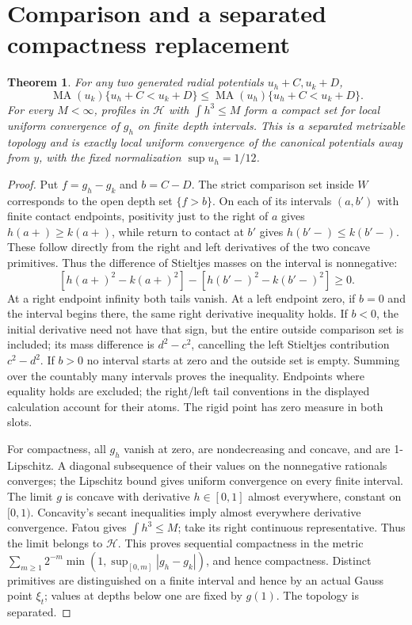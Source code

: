 \documentclass[11pt]{article}
\newtheorem{theorem}{Theorem}
\newcommand{\MA}{\operatorname{MA}}
\begin{document}
\section{Comparison and a separated compactness replacement}
\begin{theorem}\label{thm:comparison}
For any two generated radial potentials $u_h+C,u_k+D$,
\[
 \MA(u_k)\{u_h+C<u_k+D\}\leq
 \MA(u_h)\{u_h+C<u_k+D\}.
\]
For every $M<\infty$, profiles in $\mathcal H$ with $\int h^3\leq M$
form a compact set for local uniform convergence of $g_h$ on finite
depth intervals. This is a separated metrizable topology and is exactly
local uniform convergence of the canonical potentials away from $y$,
with the fixed normalization $\sup u_h=1/12$.
\end{theorem}
\begin{proof}
Put $f=g_h-g_k$ and $b=C-D$. The strict comparison set inside $W$
corresponds to the open depth set $\{f>b\}$. On each of its intervals
$(a,b')$ with finite contact endpoints, positivity just to the right of
$a$ gives $h(a+)\geq k(a+)$, while return to contact at $b'$ gives
$h(b'-)\leq k(b'-)$. These follow directly from the right and left
derivatives of the two concave primitives. Thus the difference of
Stieltjes masses on the interval is nonnegative:
\[
 [h(a+)^2-k(a+)^2]-[h(b'-)^2-k(b'-)^2]\geq0.
\]
At a right endpoint infinity both tails vanish. At a left endpoint zero,
if $b=0$ and the interval begins there, the same right derivative
inequality holds. If $b<0$, the initial derivative need not have that
sign, but the entire outside comparison set is included; its mass
difference is $d^2-c^2$, cancelling the left Stieltjes contribution
$c^2-d^2$. If $b>0$ no interval starts at zero and the outside set is
empty. Summing over the countably many intervals proves the inequality.
Endpoints where equality holds are excluded; the right/left tail
conventions in the displayed calculation account for their atoms.
The rigid point has zero measure in both slots.

For compactness, all $g_h$ vanish at zero, are nondecreasing and
concave, and are 1-Lipschitz. A diagonal subsequence of their values on
the nonnegative rationals converges; the Lipschitz bound gives uniform
convergence on every finite interval. The limit $g$ is concave with
derivative $h\in[0,1]$ almost everywhere, constant on $[0,1)$.
Concavity's secant inequalities imply almost everywhere derivative
convergence. Fatou gives $\int h^3\leq M$; take its right continuous
representative. Thus the limit belongs to $\mathcal H$. This proves
sequential compactness in the metric
$\sum_{m\geq1}2^{-m}\min(1,\sup_{[0,m]}|g_h-g_k|)$, and hence compactness.
Distinct primitives are distinguished on a finite interval and hence
by an actual Gauss point $\xi_t$; values at depths below one are fixed
by $g(1)$. The topology is separated.


\end{proof}
\end{document}

